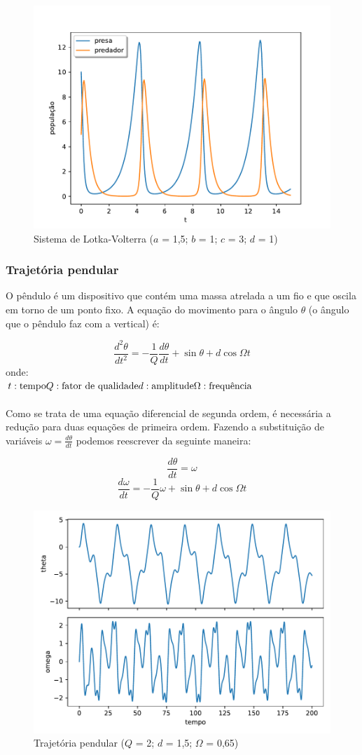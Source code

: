 \begin{figure}[htb!]
	\centering
	\caption{Sistema de Lotka-Volterra ($a$ = 1,5; $b$ = 1; $c$ = 3; $d$ = 1)}
	\label{fig:lotka-volterra}
	\includegraphics[width=0.7\linewidth]{figs/lotka-volterra}
\end{figure}


\subsubsection{Trajetória pendular}
O pêndulo é um dispositivo que contém uma massa atrelada a um fio e que oscila em torno de um ponto fixo. A equação do movimento para o ângulo $\theta$ (o ângulo que o pêndulo faz com a vertical) é:

$$
\frac{d^2\theta}{dt^2} = -\frac{1}{Q}\frac{d\theta}{dt} + \sin{\theta} + d\cos{\Omega t}
$$
onde:\\
$
t: \text{tempo}\\
Q: \text{fator de qualidade}\\
d: \text{amplitude}\\
\Omega: \text{frequência}
$
\\\\
Como se trata de uma equação diferencial de segunda ordem, é necessária a redução para duas equações de primeira ordem. Fazendo a substituição de variáveis $\omega = \frac{d\theta}{dt}$ podemos reescrever da seguinte maneira:

$$
\frac{d\theta}{dt} = \omega
$$$$
\frac{d\omega}{dt} = -\frac{1}{Q}\omega + \sin{\theta} + d\cos{\Omega t}
$$

\begin{figure}[h!]
	\centering
	\caption{Trajetória pendular ($Q$ = 2; $d$ = 1,5; $\Omega$ = 0,65)}
	\label{fig:pendulo}
	\includegraphics[width=0.7\linewidth]{figs/pendulo}
\end{figure}

